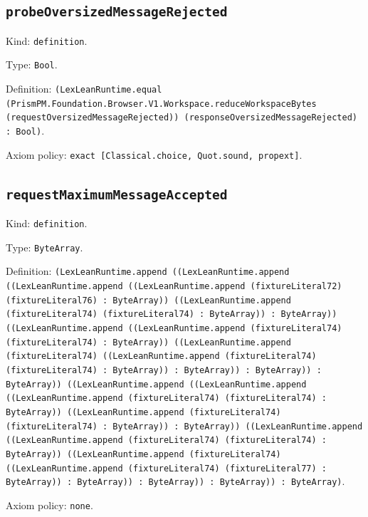 \documentclass[11pt]{article}
\begin{document}
\subsection*{\texttt{probeOversizedMessageRejected}}
\noindent Kind: \texttt{definition}.\par
\noindent Type: \texttt{Bool}.\par
\noindent Definition: \texttt{(LexLeanRuntime.equal (PrismPM.Foundation.Browser.V1.Workspace.reduceWorkspaceBytes (requestOversizedMessageRejected)) (responseOversizedMessageRejected) : Bool)}.\par
\noindent Axiom policy: \texttt{exact [Classical.choice, Quot.sound, propext]}.\par
\subsection*{\texttt{requestMaximumMessageAccepted}}
\noindent Kind: \texttt{definition}.\par
\noindent Type: \texttt{ByteArray}.\par
\noindent Definition: \texttt{(LexLeanRuntime.append ((LexLeanRuntime.append ((LexLeanRuntime.append ((LexLeanRuntime.append (fixtureLiteral72) (fixtureLiteral76) : ByteArray)) ((LexLeanRuntime.append (fixtureLiteral74) (fixtureLiteral74) : ByteArray)) : ByteArray)) ((LexLeanRuntime.append ((LexLeanRuntime.append (fixtureLiteral74) (fixtureLiteral74) : ByteArray)) ((LexLeanRuntime.append (fixtureLiteral74) ((LexLeanRuntime.append (fixtureLiteral74) (fixtureLiteral74) : ByteArray)) : ByteArray)) : ByteArray)) : ByteArray)) ((LexLeanRuntime.append ((LexLeanRuntime.append ((LexLeanRuntime.append (fixtureLiteral74) (fixtureLiteral74) : ByteArray)) ((LexLeanRuntime.append (fixtureLiteral74) (fixtureLiteral74) : ByteArray)) : ByteArray)) ((LexLeanRuntime.append ((LexLeanRuntime.append (fixtureLiteral74) (fixtureLiteral74) : ByteArray)) ((LexLeanRuntime.append (fixtureLiteral74) ((LexLeanRuntime.append (fixtureLiteral74) (fixtureLiteral77) : ByteArray)) : ByteArray)) : ByteArray)) : ByteArray)) : ByteArray)}.\par
\noindent Axiom policy: \texttt{none}.\par
\end{document}
